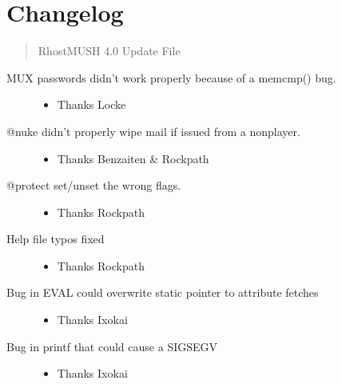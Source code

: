 \documentclass[letterpaper,10pt,english]{sphinxmanual}
\begin{document}
\chapter{Changelog}
\label{\detokenize{changes:changelog}}\label{\detokenize{changes::doc}}\begin{quote}

\sphinxAtStartPar
RhostMUSH 4.0 Update File
\end{quote}
\begin{description}
\item[{MUX passwords didn’t work properly because of a memcmp() bug.}] \leavevmode\begin{itemize}
\item {} 
\sphinxAtStartPar
Thanks Locke

\end{itemize}

\item[{@nuke didn’t properly wipe mail if issued from a non\sphinxhyphen{}player.}] \leavevmode\begin{itemize}
\item {} 
\sphinxAtStartPar
Thanks Benzaiten \& Rockpath

\end{itemize}

\item[{@protect set/unset the wrong flags.}] \leavevmode\begin{itemize}
\item {} 
\sphinxAtStartPar
Thanks Rockpath

\end{itemize}

\item[{Help file typos fixed}] \leavevmode\begin{itemize}
\item {} 
\sphinxAtStartPar
Thanks Rockpath

\end{itemize}

\item[{Bug in EVAL could overwrite static pointer to attribute fetches}] \leavevmode\begin{itemize}
\item {} 
\sphinxAtStartPar
Thanks Ixokai

\end{itemize}

\item[{Bug in printf that could cause a SIGSEGV}] \leavevmode\begin{itemize}
\item {} 
\sphinxAtStartPar
Thanks Ixokai


\end{itemize}
\end{description}
\end{document}
